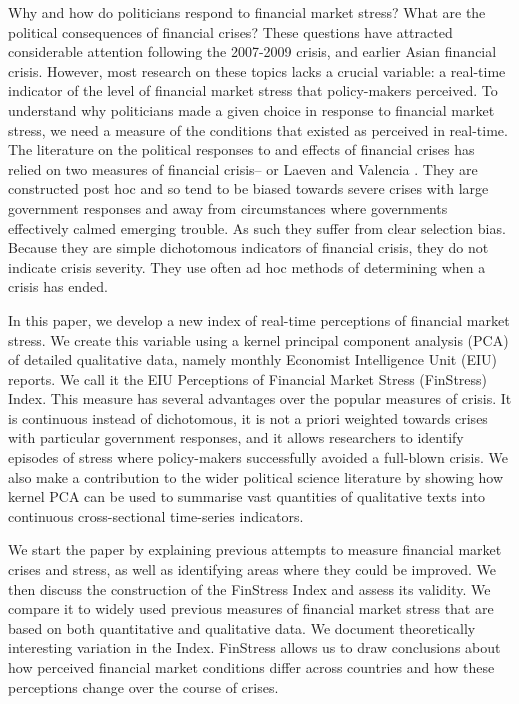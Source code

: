 \documentclass[]{article}
\begin{document}
Why and how do politicians respond to financial market stress? What are the political consequences of financial crises? These questions have attracted considerable attention following the 2007-2009 crisis, and earlier Asian financial crisis. However, most research on these topics lacks a crucial variable: a real-time indicator of the level of financial market stress that policy-makers perceived. To understand why politicians made a given choice in response to financial market stress, we need a measure of the conditions that existed as perceived in real-time. The literature on the political responses to and effects of financial crises has relied on two measures of financial crisis--\cite{Reinhart2009,ReinhartRog2010} or Laeven and Valencia \citeyearpar[and their predecessors]{laeven2013}. They are constructed post hoc and so tend to be biased towards severe crises with large government responses and away from circumstances where governments effectively calmed emerging trouble. As such they suffer from clear selection bias. Because they are simple dichotomous indicators of financial crisis, they do not indicate crisis severity. They use often ad hoc methods of determining when a crisis has ended.

In this paper, we develop a new index of real-time perceptions of financial market stress. We create this variable using a kernel principal component analysis (PCA) of detailed qualitative data, namely monthly Economist Intelligence Unit (EIU) reports. We call it the EIU Perceptions of Financial Market Stress (FinStress) Index. This measure has several advantages over the popular measures of crisis. It is continuous instead of dichotomous, it is not a priori weighted towards crises with particular government responses, and it allows researchers to identify episodes of stress where policy-makers successfully avoided a full-blown crisis. We also make a contribution to the wider political science literature by showing how kernel PCA can be used to summarise vast quantities of qualitative texts into continuous cross-sectional time-series indicators.

We start the paper by explaining previous attempts to measure financial market crises and stress, as well as identifying areas where they could be improved. We then discuss the construction of the FinStress Index and assess its validity. We compare it to widely used previous measures of financial market stress that are based on both quantitative and qualitative data. We document theoretically interesting variation in the Index. FinStress allows us to draw conclusions about how perceived financial market conditions differ across countries and how these perceptions change over the course of crises.
\end{document}
